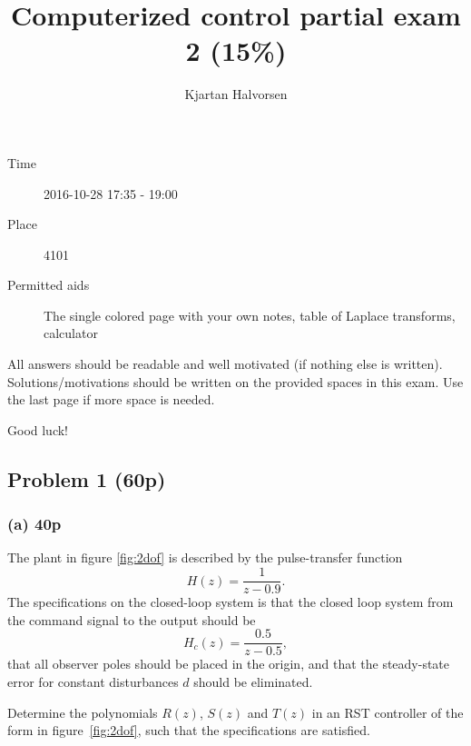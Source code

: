 \documentclass[letter,12pt]{article}
\title{Computerized control partial exam 2 (15\%)}
\author{Kjartan Halvorsen}
\newcommand{\bmpl}{\begin{minipage}[t]{\textwidth}}
\newcommand{\emp}{\end{minipage}}
\begin{document}
\maketitle


\begin{description}
\item[Time] 2016-10-28 17:35 - 19:00
\item[Place] 4101
\item[Permitted aids] The single colored page with your own notes, table of Laplace transforms, calculator
\end{description}

All answers should be readable and well motivated (if nothing else is written). Solutions/motivations should be written on the provided spaces in this exam. Use the last page if more space is needed.

\begin{center}
{\Large Good luck!} \\
\end{center}

\noindent
\fbox{
\bmpl
{\bf Matricual and name:}\\
\vspace*{30mm}
\emp}

\clearpage



\subsection*{Problem 1 (60p)}

\subsubsection*{(a) 40p}
The plant in figure \ref{fig:2dof} is described by the pulse-transfer function
\begin{equation}
H(z) = \frac{1}{z-0.9}.
\end{equation}
The specifications on the closed-loop system is that the closed loop system from the command signal to the output should be 
\begin{equation}
H_c(z) = \frac{0.5}{z-0.5},
\end{equation}
that all observer poles should be placed in the origin, and that the steady-state error for constant disturbances $d$ should be eliminated. 

Determine the polynomials \(R(z)\), \(S(z)\) and \(T(z)\) in an RST controller of the form in figure~\ref{fig:2dof}, such that the specifications are satisfied.
\end{document}

